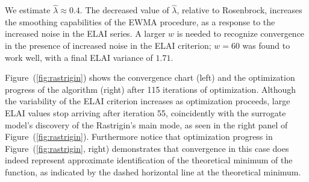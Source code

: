 \documentclass{article}
\begin{document}
We estimate $\hat\lambda \approx 0.4$. The decreased value of $\hat\lambda$, 
relative to Rosenbrock, increases the smoothing capabilities of the EWMA 
procedure, as a response to the increased noise in the ELAI series. 
A larger $w$ is needed to recognize convergence in the presence of increased 
noise in the ELAI criterion; $w=60$ was found to work well, with a 
final ELAI variance of $1.71$.

%
%

%
Figure~(\ref{fig:rastrigin}) shows the convergence chart (left) and the 
optimization progress of the algorithm (right) after 115 iterations of 
optimization. Although the variability of the ELAI criterion increases as 
optimization proceeds, large ELAI values stop arriving after iteration 55, 
coincidently with the surrogate model's discovery of the Rastrigin's main 
mode, as seen in the right panel of Figure~(\ref{fig:rastrigin}). Furthermore 
notice that optimization progress in Figure~(\ref{fig:rastrigin}, right) 
demonstrates that convergence in this case does indeed represent approximate 
identification of the theoretical minimum of the function, as indicated by the 
dashed horizontal line at the theoretical minimum. 

%
%
%

\end{document}
